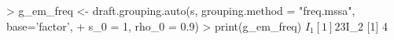 \begin{CodeChunk}
\begin{CodeInput}


> g_em_freq <- draft.grouping.auto(s, grouping.method = "freq.mssa", base='factor',
+                                  s_0 = 1, rho_0 = 0.9)
> print(g_em_freq)
$I_1
[1] 2 3
$I_2
[1] 4
\end{CodeInput}

\end{CodeChunk}